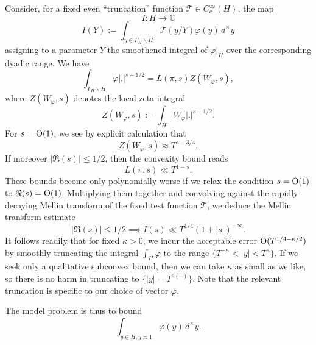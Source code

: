 \documentclass[reqno]{amsart} 
\numberwithin{equation}{section}
\numberwithin{theorem}{section}
\begin{document}
Consider, for a fixed even ``truncation'' function $\mathcal{T} \in C_c^\infty(H)$, the map
\begin{equation*}
  I : H \rightarrow \mathbb{C} 
\end{equation*}
\begin{equation*}
  I(Y) := \int _{y \in \Gamma_{H} \backslash H}  \mathcal{T}(y/Y) \varphi(y) \, d^\times y
\end{equation*}
assigning to a parameter $Y$ the smoothened integral of $\varphi|_H$ over the corresponding dyadic range.  We have
\begin{equation*}
  \int _{\Gamma_{H} \backslash H} \varphi |.|^{s-1/2} = L(\pi,s) Z(W_\varphi,s),
\end{equation*}
where $Z(W_\varphi,s)$ denotes the local zeta integral
\begin{equation*}
  Z(W_\varphi,s) := \int _{H} W_\varphi |.|^{s-1/2}.
\end{equation*}
For $s = \operatorname{O}(1)$, we see by explicit calculation that
\begin{equation*}
  Z(W_\varphi,s) \approx T^{s-3/4}.
\end{equation*}
If moreover $|\Re(s)| \leq 1/2$, then the convexity bound reads
\begin{equation*}
  L(\pi,s) \ll T^{1 - s}.
\end{equation*}
These bounds become only polynomially worse if we relax the condition $s = \operatorname{O}(1)$ to $\Re(s) = \operatorname{O}(1)$.  Multiplying them together and convolving against the rapidly-decaying Mellin transform of the fixed test function $\mathcal{T}$, we deduce the Mellin transform estimate
\begin{equation*}
|\Re(s)| \leq 1/2 \implies \tilde{I}(s) \ll T^{1/4} (1 + |s|)^{-\infty}.
\end{equation*}
It follows readily that for fixed $\kappa > 0$, we incur the acceptable error $\operatorname{O}(T^{1/4 -\kappa/2})$ by smoothly truncating the integral $\int_H \varphi$ to the range $\{T^{-\kappa} < |y| < T^{\kappa}\}$.  If we seek only a qualitative subconvex bound, then we can take $\kappa$ as small as we like, so there is no harm in truncating to $\{ |y| = T^{o(1)} \}$.  Note that the relevant truncation is specific to our choice of vector $\varphi$.


The model problem is thus to bound
\begin{equation}\label{eq:int-_y-in}
  \int _{y \in H, y \asymp 1} \varphi(y) \, d^\times y.
\end{equation}
\end{document}
